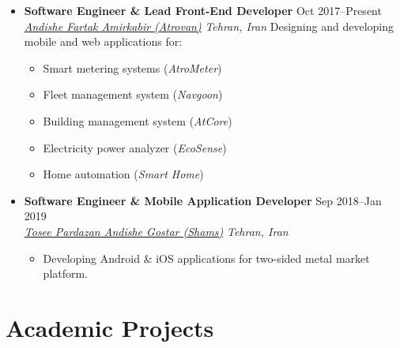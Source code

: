 \documentclass[11pt,a4paper,roman]{moderncv} %
\newcommand*{\authorimg}[1]{%
	\raisebox{-.3\baselineskip}{%
		\texttt{[image: \#1]}%
	}%
}
\begin{document}
\begin{itemize}
	\item \textbf{Software Engineer \& Lead Front-End Developer} \hfill Oct 2017--Present \\
	\href{https://atrovan.com}{\authorimg{pictures/atrovan.png} \emph{Andishe Fartak Amirkabir (Atrovan)}} \hfill \emph{Tehran, Iran}
	\vspace{1mm}
	\linebreak
	Designing and developing mobile and web applications for:
	\begin{itemize}
		\item Smart metering systems (\emph{AtroMeter})
		\item Fleet management system (\emph{Navgoon})
		\item Building management system (\emph{AtCore})
		\item Electricity power analyzer (\emph{EcoSense})
		\item Home automation (\emph{Smart Home})
	\end{itemize}
	
	\vspace{10pt}
	
	\item \textbf{Software Engineer \& Mobile Application Developer} \hfill Sep 2018--Jan 2019 \\
	\href{http://shamstech.ir}{\authorimg{pictures/shams.png} \emph{Tosee Pardazan Andishe Gostar (Shams)}} \hfill \emph{Tehran, Iran}
	
	\begin{itemize}
		\item Developing Android \& iOS applications for two-sided metal market platform.
	\end{itemize}
\end{itemize}

\section{Academic Projects}
\end{document}
